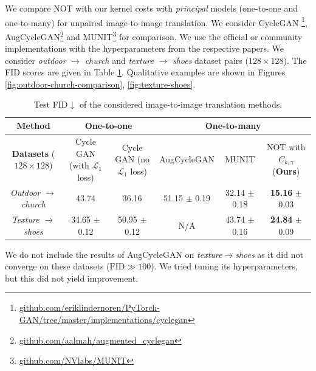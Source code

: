 \documentclass{article} %
\begin{document}
We compare NOT with our kernel costs with \textit{principal} models (one-to-one and one-to-many) for unpaired image-to-image translation. We consider CycleGAN \footnote{\url{github.com/eriklindernoren/PyTorch-GAN/tree/master/implementations/cyclegan}}\citep{zhu2017unpaired}, AugCycleGAN\footnote{\url{github.com/aalmah/augmented_cyclegan}} \citep{almahairi2018augmented} and MUNIT\footnote{\url{github.com/NVlabs/MUNIT}} \citep{huang2018multimodal} for comparison. We use the official or community implementations with the hyperparameters from the respective papers. We consider \textit{outdoor} $\rightarrow$ \textit{church} and \textit{texture} $\rightarrow$ \textit{shoes} dataset pairs ($128\times 128$). The FID scores are given in Table \ref{table-fid-ext}. Qualitative examples are shown in Figures \ref{fig:outdoor-church-comparison}, \ref{fig:texture-shoes}.
\begin{table}[!h]
\centering
\small
\begin{tabular}{|c|c|c|c|c|c|}
\toprule
\textbf{Method} & \multicolumn{2}{c|}{\textbf{One-to-one}} & \multicolumn{3}{c|}{\textbf{One-to-many}} \\ \midrule
\makecell{\textbf{Datasets}\\($128\times 128$)} & \makecell{Cycle GAN\\ (with $\mathcal{L}_{1}$ loss)} & \makecell{Cycle GAN\\ (no $\mathcal{L}_{1}$ loss)} & AugCycleGAN & MUNIT & \makecell{NOT with $C_{k,\gamma}$\\ (\textbf{Ours})} \\ \midrule
\textit{Outdoor} $\rightarrow$ \textit{church} & 43.74 & 36.16 &  51.15 $\pm$ 0.19 & 32.14 $\pm$ 0.18 & \textbf{15.16} $\pm$ 0.03 \\ \midrule
\textit{Texture} $\rightarrow$ \textit{shoes} & 34.65 $\pm$ 0.12 & 50.95 $\pm$ 0.12 &  N/A & 43.74 $\pm$ 0.16 & \textbf{24.84} $\pm$ 0.09 \\  \bottomrule
\end{tabular}
\vspace{2.5mm}
\caption{\centering Test FID$\downarrow$ of the considered image-to-image translation methods.}
\label{table-fid-ext}
\end{table}

We do not include the results of AugCycleGAN on \textit{texture}$\rightarrow$\textit{shoes} as it did not converge on these datasets ($\text{FID}\!\gg\! 100$). We tried tuning its hyperparameters, but this did not yield improvement.
\end{document}

